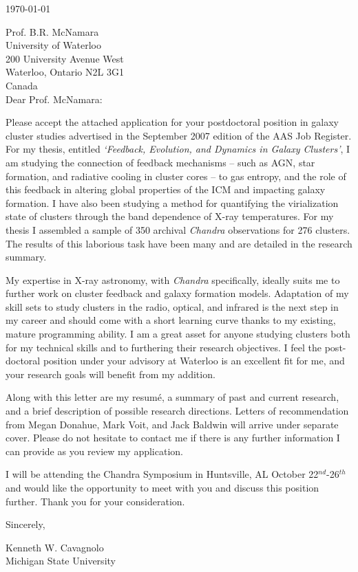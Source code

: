\documentclass[11pt]{article}
\begin{document}
\today

Prof. B.R. McNamara\\
University of Waterloo\\
200 University Avenue West\\
Waterloo, Ontario N2L 3G1\\
Canada\\

Dear Prof. McNamara:

Please accept the attached application for your postdoctoral
position in galaxy cluster studies advertised in the September 2007 edition
of the AAS Job Register. For my thesis, entitled {\textit{`Feedback,
Evolution, and Dynamics in Galaxy Clusters'}}, I am studying
the connection of feedback mechanisms -- such as AGN, star formation, and
radiative cooling in cluster cores -- to gas entropy, and the role
of this feedback in altering global properties of the ICM and 
impacting galaxy formation. I have also been studying a method for
quantifying the virialization state of clusters through the band
dependence of X-ray temperatures. For my thesis I assembled a sample
of 350 archival {\textit{Chandra}} observations for 276 clusters. The
results of this laborious task have been many and are detailed in the
research summary.

My expertise in X-ray astronomy, with {\textit{Chandra}}
specifically, ideally suits me to further work on cluster feedback and
galaxy formation models. Adaptation of my skill sets to study clusters
in the radio, optical, and infrared is the next step in my
career and should come with a short learning curve thanks to my
existing, mature programming ability. I am a great asset for anyone
studying clusters both for my technical skills and to furthering
their research objectives. I feel the post-doctoral position under your
advisory at Waterloo is an excellent fit for me, and your research
goals will benefit from my addition.

Along with this letter are my resum\'{e}, a summary of past and
current research, and a brief description of possible research
directions. Letters of recommendation from Megan Donahue, Mark Voit,
and Jack Baldwin will arrive under separate cover. Please do not
hesitate to contact me if there is any further information I can
provide as you review my application.

I will be attending the Chandra Symposium in Huntsville, AL October
22$^{nd}$-26$^{th}$ and would like the opportunity to
meet with you and discuss this position further. Thank you for your
consideration.

Sincerely,\\
\begin{minipage}{7.5in}
\end{minipage}
Kenneth W. Cavagnolo\\
Michigan State University
\end{document}
